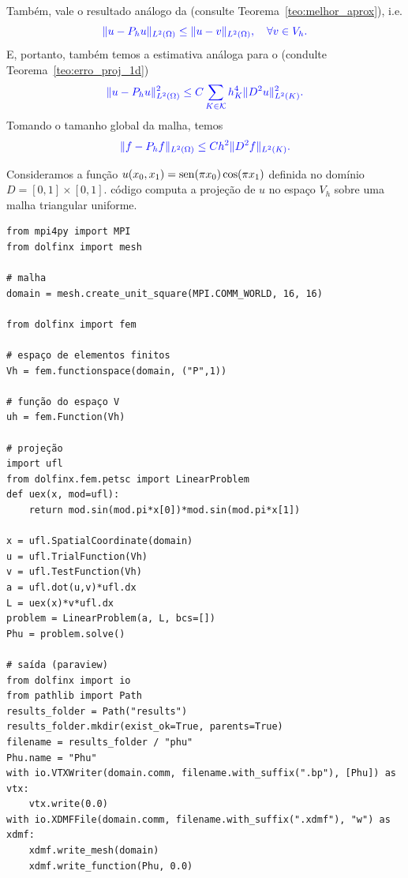 Também, vale o resultado análogo da  (consulte Teorema~\ref{teo:melhor_aprox}), i.e.
\begin{equation}\color{blue}\|u-P_hu\|_{L^2(\Omega)} \leq \|u - v\|_{L^2(\Omega)},\quad\forall v\in V_h.
\end{equation}
E, portanto, também temos a estimativa análoga para o  (condulte Teorema~\ref{teo:erro_proj_1d})
\begin{equation}\color{blue}\|u-P_hu\|_{L^2(\Omega)}^2 \leq C\sum_{K\in\mathcal{K}} h_K^4\|D^2 u\|_{L^2(K)}^2.
\end{equation}
Tomando o tamanho global da malha, temos
\begin{equation}\label{eq:erro_projec_2d}\color{blue}\|f-P_hf\|_{L^2(\Omega)} \leq Ch^2\|D^2 f\|_{L^2(K)}.
\end{equation}

\begin{ex}\label{cap_mef2d_sec_proj:ex:proj}
Consideramos a função $u(x_0,x_1) = \operatorname{sen}(\pi x_0)\cos(\pi x_1)$ definida no domínio $D = [0, 1]\times [0, 1]$. código computa a projeção de $u$ no espaço $V_h$ sobre uma malha triangular uniforme.
\begin{lstlisting}
from mpi4py import MPI
from dolfinx import mesh

# malha
domain = mesh.create_unit_square(MPI.COMM_WORLD, 16, 16)

from dolfinx import fem

# espaço de elementos finitos
Vh = fem.functionspace(domain, ("P",1))

# função do espaço V
uh = fem.Function(Vh)

# projeção
import ufl
from dolfinx.fem.petsc import LinearProblem
def uex(x, mod=ufl):
    return mod.sin(mod.pi*x[0])*mod.sin(mod.pi*x[1])

x = ufl.SpatialCoordinate(domain)
u = ufl.TrialFunction(Vh)
v = ufl.TestFunction(Vh)
a = ufl.dot(u,v)*ufl.dx
L = uex(x)*v*ufl.dx
problem = LinearProblem(a, L, bcs=[])
Phu = problem.solve()

# saída (paraview)
from dolfinx import io
from pathlib import Path
results_folder = Path("results")
results_folder.mkdir(exist_ok=True, parents=True)
filename = results_folder / "phu"
Phu.name = "Phu"
with io.VTXWriter(domain.comm, filename.with_suffix(".bp"), [Phu]) as vtx:
    vtx.write(0.0)
with io.XDMFFile(domain.comm, filename.with_suffix(".xdmf"), "w") as xdmf:
    xdmf.write_mesh(domain)
    xdmf.write_function(Phu, 0.0)
\end{lstlisting}
\end{ex}


